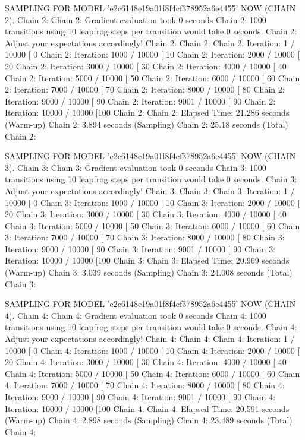 \documentclass[
]{jss}
\begin{document}
\begin{CodeChunk}
\begin{CodeOutput}
SAMPLING FOR MODEL 'e2c6148e19a01f8f4cf378952a6e4455' NOW (CHAIN 2).
Chain 2: 
Chain 2: Gradient evaluation took 0 seconds
Chain 2: 1000 transitions using 10 leapfrog steps per transition would take 0 seconds.
Chain 2: Adjust your expectations accordingly!
Chain 2: 
Chain 2: 
Chain 2: Iteration:    1 / 10000 [  0%
Chain 2: Iteration: 1000 / 10000 [ 10%
Chain 2: Iteration: 2000 / 10000 [ 20%
Chain 2: Iteration: 3000 / 10000 [ 30%
Chain 2: Iteration: 4000 / 10000 [ 40%
Chain 2: Iteration: 5000 / 10000 [ 50%
Chain 2: Iteration: 6000 / 10000 [ 60%
Chain 2: Iteration: 7000 / 10000 [ 70%
Chain 2: Iteration: 8000 / 10000 [ 80%
Chain 2: Iteration: 9000 / 10000 [ 90%
Chain 2: Iteration: 9001 / 10000 [ 90%
Chain 2: Iteration: 10000 / 10000 [100%
Chain 2: 
Chain 2:  Elapsed Time: 21.286 seconds (Warm-up)
Chain 2:                3.894 seconds (Sampling)
Chain 2:                25.18 seconds (Total)
Chain 2: 

SAMPLING FOR MODEL 'e2c6148e19a01f8f4cf378952a6e4455' NOW (CHAIN 3).
Chain 3: 
Chain 3: Gradient evaluation took 0 seconds
Chain 3: 1000 transitions using 10 leapfrog steps per transition would take 0 seconds.
Chain 3: Adjust your expectations accordingly!
Chain 3: 
Chain 3: 
Chain 3: Iteration:    1 / 10000 [  0%
Chain 3: Iteration: 1000 / 10000 [ 10%
Chain 3: Iteration: 2000 / 10000 [ 20%
Chain 3: Iteration: 3000 / 10000 [ 30%
Chain 3: Iteration: 4000 / 10000 [ 40%
Chain 3: Iteration: 5000 / 10000 [ 50%
Chain 3: Iteration: 6000 / 10000 [ 60%
Chain 3: Iteration: 7000 / 10000 [ 70%
Chain 3: Iteration: 8000 / 10000 [ 80%
Chain 3: Iteration: 9000 / 10000 [ 90%
Chain 3: Iteration: 9001 / 10000 [ 90%
Chain 3: Iteration: 10000 / 10000 [100%
Chain 3: 
Chain 3:  Elapsed Time: 20.969 seconds (Warm-up)
Chain 3:                3.039 seconds (Sampling)
Chain 3:                24.008 seconds (Total)
Chain 3: 

SAMPLING FOR MODEL 'e2c6148e19a01f8f4cf378952a6e4455' NOW (CHAIN 4).
Chain 4: 
Chain 4: Gradient evaluation took 0 seconds
Chain 4: 1000 transitions using 10 leapfrog steps per transition would take 0 seconds.
Chain 4: Adjust your expectations accordingly!
Chain 4: 
Chain 4: 
Chain 4: Iteration:    1 / 10000 [  0%
Chain 4: Iteration: 1000 / 10000 [ 10%
Chain 4: Iteration: 2000 / 10000 [ 20%
Chain 4: Iteration: 3000 / 10000 [ 30%
Chain 4: Iteration: 4000 / 10000 [ 40%
Chain 4: Iteration: 5000 / 10000 [ 50%
Chain 4: Iteration: 6000 / 10000 [ 60%
Chain 4: Iteration: 7000 / 10000 [ 70%
Chain 4: Iteration: 8000 / 10000 [ 80%
Chain 4: Iteration: 9000 / 10000 [ 90%
Chain 4: Iteration: 9001 / 10000 [ 90%
Chain 4: Iteration: 10000 / 10000 [100%
Chain 4: 
Chain 4:  Elapsed Time: 20.591 seconds (Warm-up)
Chain 4:                2.898 seconds (Sampling)
Chain 4:                23.489 seconds (Total)
Chain 4: 


\end{CodeOutput}
\end{CodeChunk}
\end{document}
